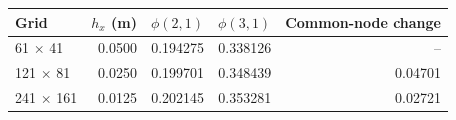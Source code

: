 \begin{tabular}{lrrrr}
\toprule
Grid & $h_x$ (m) & $\phi(2,1)$ & $\phi(3,1)$ & Common-node change \\
\midrule
61 $\times$ 41 & 0.0500 & 0.194275 & 0.338126 & -- \\
121 $\times$ 81 & 0.0250 & 0.199701 & 0.348439 & 0.04701 \\
241 $\times$ 161 & 0.0125 & 0.202145 & 0.353281 & 0.02721 \\
\bottomrule
\end{tabular}

